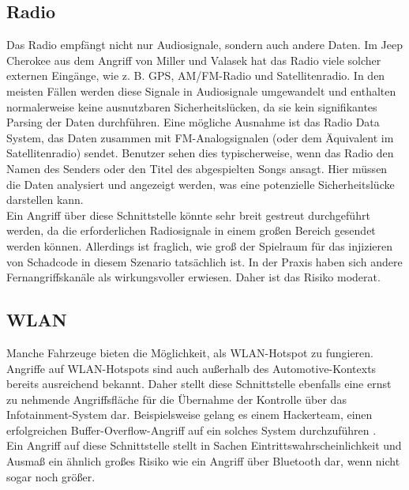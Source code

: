 \subsection{Radio}
Das Radio empfängt nicht nur Audiosignale, sondern auch andere Daten. Im Jeep Cherokee aus dem Angriff von Miller und Valasek hat das Radio viele solcher externen Eingänge, wie z. B. GPS, AM/FM-Radio und Satellitenradio. In den meisten Fällen werden diese Signale in Audiosignale umgewandelt und enthalten normalerweise keine ausnutzbaren Sicherheitslücken, da sie kein signifikantes Parsing der Daten durchführen. Eine mögliche Ausnahme ist das Radio Data System, das Daten zusammen mit FM-Analogsignalen (oder dem Äquivalent im Satellitenradio) sendet. Benutzer sehen dies typischerweise, wenn das Radio den Namen des Senders oder den Titel des abgespielten Songs ansagt. Hier müssen die Daten analysiert und angezeigt werden, was eine potenzielle Sicherheitslücke darstellen kann. \cite[17]{Miller.2015} \\
Ein Angriff über diese Schnittstelle könnte sehr breit gestreut durchgeführt werden, da die erforderlichen Radiosignale in einem großen Bereich gesendet werden können. Allerdings ist fraglich, wie groß der Spielraum für das injizieren von Schadcode in diesem Szenario tatsächlich ist. In der Praxis haben sich andere Fernangriffskanäle als wirkungsvoller erwiesen. Daher ist das Risiko moderat.

\subsection{WLAN}
Manche Fahrzeuge bieten die Möglichkeit, als \ac{WLAN}-Hotspot zu fungieren. Angriffe auf \acs{WLAN}-Hotspots sind auch außerhalb des Automotive-Kontexts bereits ausreichend bekannt. Daher stellt diese Schnittstelle ebenfalls eine ernst zu nehmende  Angriffsfläche für die Übernahme der Kontrolle über das Infotainment-System dar. Beispielsweise gelang es einem Hackerteam, einen erfolgreichen Buffer-Overflow-Angriff auf ein solches System durchzuführen \cite[18]{Miller.2015}.\\
Ein Angriff auf diese Schnittstelle stellt in Sachen Eintrittswahrscheinlichkeit und Ausmaß ein ähnlich großes Risiko wie ein Angriff über Bluetooth dar, wenn nicht sogar noch größer.

